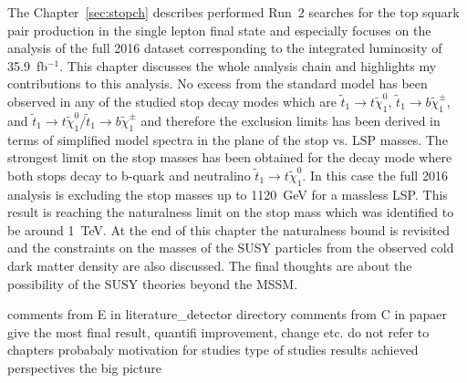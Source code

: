 The Chapter~\ref{sec:stopch} describes performed Run~2 searches for the top squark pair production in the single lepton final state and especially focuses on the analysis of the full 2016 dataset corresponding to the integrated luminosity of 35.9~fb$^{-1}$. This chapter discusses the whole analysis chain and highlights my contributions to this analysis. No excess from the standard model has been observed in any of the studied stop decay modes which are $\tilde{t}_{1} \to t  \tilde{\chi}^{0}_{1} $, $\tilde{t}_{1} \to b  \tilde{\chi}^{\pm}_{1}$, and $ \tilde{t}_{1} \to t  \tilde{\chi}^{0}_{1}/\tilde{t}_{1} \to b  \tilde{\chi}^{\pm}_{1} $ and therefore the exclusion limits has been derived in terms of simplified model spectra in the plane of the stop vs. LSP masses. The strongest limit on the stop masses has been obtained for the decay mode where both stops decay to b-quark and neutralino $\tilde{t}_{1} \to t  \tilde{\chi}^{0}_{1}$. In this case the full 2016 analysis is excluding the stop masses up to 1120~GeV for a massless LSP. This result is reaching the naturalness limit on the stop mass which was identified to be around 1~TeV. At the end of this chapter the naturalness bound is revisited and the constraints on the masses of the SUSY particles from the observed cold dark matter density are also discussed. The final thoughts are about the possibility of the SUSY theories beyond the MSSM.

comments from E in literature_detector directory
comments from C in papaer
give the most final result, quantifi improvement, change etc.
do not refer to chapters probabaly
motivation for studies
type of studies
results achieved
perspectives
the big picture

